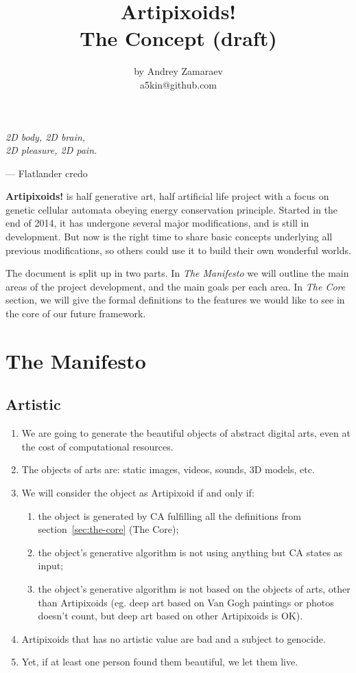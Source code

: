\documentclass[a4paper,12pt,tikz,UTF8]{article}
\title{\bf Artipixoids!\\\large The Concept (draft)}
\author{by Andrey Zamaraev\\a5kin@github.com}
\begin{document}
  \maketitle

  \epigraph{
    \it 2D body, 2D brain,\\
    2D pleasure, 2D pain.
  }{--- Flatlander credo}

  \textbf{Artipixoids!} is half generative art, half artificial life project with a focus on genetic cellular automata obeying energy conservation principle. Started in the end of 2014, it has undergone several major modifications, and is still in development. But now is the right time to share basic concepts underlying all previous modifications, so others could use it to build their own wonderful worlds.

  The document is split up in two parts. In \textit{The Manifesto} we will outline the main areas of the project development, and the main goals per each area. In \textit{The Core} section, we will give the formal definitions to the features we would like to see in the core of our future framework. 

  \newpage
  \tableofcontents

  \newpage
  \section{The Manifesto}

  \subsection{Artistic}
  \label{subsec:manifest-artistic}

    \begin{enumerate}
      \item We are going to generate the beautiful objects of abstract digital arts, even at the cost of computational resources.
      \item The objects of arts are: static images, videos, sounds, 3D models, etc.
      \item We will consider the object as Artipixoid if and only if:
        \begin{enumerate}
          \item \label{itm:valid-artipixoid} the object is generated by CA fulfilling all the definitions from section~\ref{sec:the-core} (The Core);
          \item the object's generative algorithm is not using anything but CA states as input;
          \item the object's generative algorithm is not based on the objects of arts, other than Artipixoids (eg. deep art based on Van Gogh paintings or photos doesn't count, but deep art based on other Artipixoids is OK).
        \end{enumerate}
      \item Artipixoids that has no artistic value are bad and a subject to genocide.
      \item Yet, if at least one person found them beautiful, we let them live.
    \end{enumerate}
\end{document}
